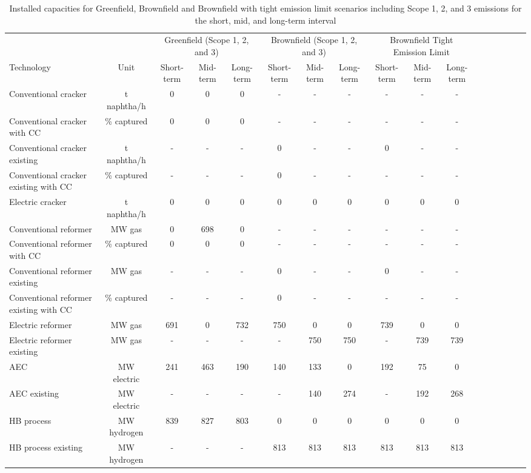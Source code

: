 \begin{table}[h!]
\centering
\caption{Installed capacities for Greenfield, Brownfield and Brownfield with tight emission limit scenarios including Scope 1, 2, and 3 emissions for the short, mid, and long-term interval}
\label{tab:results_emission_limit}
\begin{adjustbox}{angle=90, max width=\textheight}\begin{tabular}{lcccccccccccccccc}
\toprule
\multicolumn{2}{r}{} & \multicolumn{3}{c}{Greenfield (Scope 1, 2, and 3)} & \multicolumn{3}{c}{Brownfield (Scope 1, 2, and 3)} & \multicolumn{3}{c}{Brownfield Tight Emission Limit} \\
Technology & Unit & Short-term & Mid-term & Long-term & Short-term & Mid-term & Long-term & Short-term & Mid-term & Long-term \\
\midrule
Conventional cracker & t naphtha/h & 0 & 0 & 0 & - & - & - & - & - & - \\
Conventional cracker with \acs{CC} & \% captured & 0 & 0 & 0 & - & - & - & - & - & - \\
Conventional cracker existing & t naphtha/h & - & - & - & 0 & - & - & 0 & - & - \\
Conventional cracker existing with \acs{CC} & \% captured & - & - & - & 0 & - & - & - & - & - \\
Electric cracker & t naphtha/h & 0 & 0 & 0 & 0 & 0 & 0 & 0 & 0 & 0 \\
Conventional reformer & MW gas & 0 & 698 & 0 & - & - & - & - & - & - \\
Conventional reformer with \acs{CC} & \% captured & 0 & 0 & 0 & - & - & - & - & - & - \\
Conventional reformer existing & MW gas & - & - & - & 0 & - & - & 0 & - & - \\
Conventional reformer existing with \acs{CC} & \% captured & - & - & - & 0 & - & - & - & - & - \\
Electric reformer & MW gas & 691 & 0 & 732 & 750 & 0 & 0 & 739 & 0 & 0 \\
Electric reformer existing & MW gas & - & - & - & - & 750 & 750 & - & 739 & 739 \\
\acs{AEC} & MW electric & 241 & 463 & 190 & 140 & 133 & 0 & 192 & 75 & 0 \\
\acs{AEC} existing & MW electric & - & - & - & - & 140 & 274 & - & 192 & 268 \\
\acs{HB} process & MW hydrogen & 839 & 827 & 803 & 0 & 0 & 0 & 0 & 0 & 0 \\
\acs{HB} process existing & MW hydrogen & - & - & - & 813 & 813 & 813 & 813 & 813 & 813 \\

\end{tabular}
\end{adjustbox}
\end{table}
